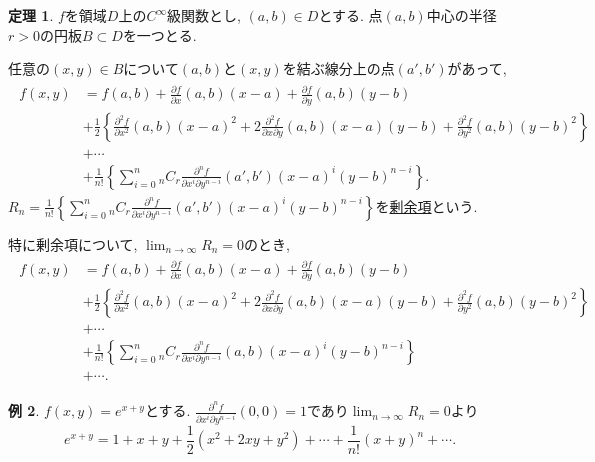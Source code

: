 \documentclass[dvipdfmx,a4paper,11pt]{article}
\theoremstyle{definition}
\newtheorem{thm}{定理}
\newtheorem{exa}[thm]{例}
\newcommand{\pdrv}[2]{\frac{\partial #1}{\partial #2}}
\newcommand{\ppdrv}[3]{\frac{\partial #1}{\partial #2 \partial #3}}
\begin{document}
    
\begin{tcolorbox}[
    colback = white,
    colframe = green!35!black,
    fonttitle = \bfseries,
    breakable = true]
    \begin{thm}
    $f$を領域$D$上の$C^{\infty}$級関数とし, $(a,b)  \in D$とする.
    点$(a,b)$中心の半径$r>0$の円板$B \subset D$を一つとる.
    
    任意の$(x,y) \in B$について$(a,b)$と$(x,y) $を結ぶ線分上の点$(a',b')$があって,
  \begin{align*}
  \begin{split}
  f(x,y) &= f(a,b) + \pdrv{f}{x}(a,b)(x-a) + \pdrv{f}{y}(a,b)(y-b) \\
  &+ \frac{1}{2} \left\{  \pdrv{^2f}{x^2}(a,b)(x-a)^2 +2 \ppdrv{^2f}{x}{y}(a,b)(x-a)(y-b)+
   \pdrv{^2f}{y^2}(a,b)(y-b) ^2    \right\}\\
   &+ \cdots \\
   &+ \frac{1}{n!}\left\{ \sum_{i=0}^{n} {}_n C_r \ppdrv{^n f}{x^i }{ y^{n-i}} (a', b') (x-a)^{i}(y-b)^{n-i}\right\}.
    \end{split}
  \end{align*}
$ R_n = \frac{1}{n!}\left\{ \sum_{i=0}^{n} {}_n C_r \ppdrv{^n f}{x^i }{ y^{n-i}} (a', b') (x-a)^{i}(y-b)^{n-i}\right\}$を\underline{剰余項}という.

特に剰余項について, $\lim_{n \rightarrow \infty} R_n = 0$のとき, 
  \begin{align*}
  \begin{split}
  f(x,y) &= f(a,b) + \pdrv{f}{x}(a,b)(x-a) + \pdrv{f}{y}(a,b)(y-b) \\
  &+ \frac{1}{2} \left\{  \pdrv{^2f}{x^2}(a,b)(x-a)^2 +2 \ppdrv{^2f}{x}{y}(a,b)(x-a)(y-b)+
   \pdrv{^2f}{y^2}(a,b)(y-b) ^2    \right\}\\
   &+ \cdots \\
   &+ \frac{1}{n!}\left\{ \sum_{i=0}^{n} {}_n C_r \ppdrv{^n f}{x^i }{ y^{n-i}} (a, b) (x-a)^{i}(y-b)^{n-i}\right\} \\
   &+ \cdots .
    \end{split}
  \end{align*}
    \end{thm}
    \end{tcolorbox}

\begin{exa}
$f(x,y) = e^{x+y}$とする.
$\ppdrv{^n f}{x^i }{ y^{n-i}}(0,0) =1 $であり$\lim_{n \rightarrow \infty} R_n = 0$より
$$
 e^{x+y} = 1 + x+ y 
  + \frac{1}{2} \left (x^2 + 2xy +y^2    \right)
   + \cdots 
   + \frac{1}{n!} \left (x +y    \right)^n
  + \cdots .
$$
\end{exa}
\end{document}
